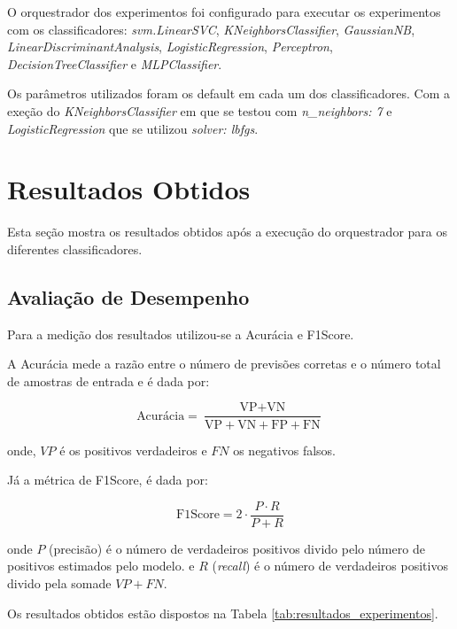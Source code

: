 \documentclass[conference]{IEEEtran}
\begin{document}
O orquestrador dos experimentos foi configurado para executar os experimentos com os classificadores: \textit{svm.LinearSVC}, \textit{KNeighborsClassifier}, \textit{GaussianNB}, \textit{LinearDiscriminantAnalysis}, \textit{LogisticRegression}, \textit{Perceptron}, \textit{DecisionTreeClassifier} e \textit{MLPClassifier}.

Os parâmetros utilizados foram os default em cada um dos classificadores. Com a exeção do \textit{KNeighborsClassifier} em que se testou com \textit{n\_neighbors: 7} e \textit{LogisticRegression} que se utilizou \textit{solver: lbfgs}.

\section{Resultados Obtidos}

Esta seção mostra os resultados obtidos após a execução do orquestrador para os diferentes classificadores.

\subsection{Avaliação de Desempenho}

Para a medição dos resultados utilizou-se a Acurácia e F1Score.

A Acurácia mede a razão entre o número de previsões corretas e o número total de amostras de entrada e é dada por:

\begin{equation}
    \text{Acurácia}=\frac{\text{VP} + \text{VN}}{\text{VP} + \text{VN} + \text{FP} + \text{FN}}
\end{equation}

onde, $VP$ é os positivos verdadeiros e $FN$ os negativos falsos.

Já a métrica de F1Score, é dada por:

\begin{equation}
    \text{F1Score} = 2 \cdot \frac{P\cdot R}{P + R}
\end{equation}

onde $P$ (precisão) é o número de verdadeiros positivos divido pelo número de positivos estimados pelo modelo. e $R$ (\textit{recall}) é o número de verdadeiros positivos divido pela somade $VP + FN$.

Os resultados obtidos estão dispostos na Tabela \ref{tab:resultados_experimentos}.
\end{document}
